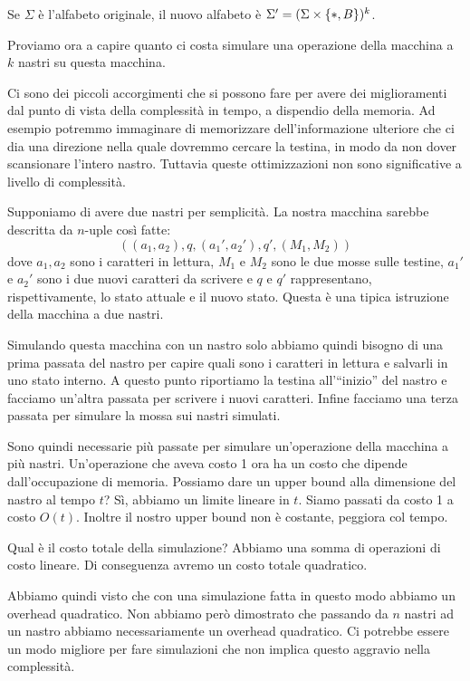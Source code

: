 Se $\Sigma$ è l'alfabeto originale, il nuovo alfabeto è $\Sigma' = (\Sigma \times
\left\{*,B\right\})^{k}$.

Proviamo ora a capire quanto ci costa simulare una operazione della macchina a $k$ nastri su questa
macchina.

Ci sono dei piccoli accorgimenti che si possono fare per avere dei miglioramenti dal punto di vista
della complessità in tempo, a dispendio della memoria. Ad esempio potremmo immaginare di
memorizzare dell'informazione ulteriore che ci dia una direzione nella quale dovremmo cercare la
testina, in modo da non dover scansionare l'intero nastro. Tuttavia queste ottimizzazioni non sono
significative a livello di complessità.

Supponiamo di avere due nastri per semplicità. La nostra macchina sarebbe descritta da $n$-uple
così fatte:
\begin{equation*}
    ((a_{1},a_{2}),q,(a_{1}',a_{2}'),q',(M_{1},M_{2}))
\end{equation*}
dove $a_{1},a_{2}$ sono i caratteri in lettura, $M_{1}$ e $M_{2}$ sono le due mosse sulle testine,
$a_{1}'$ e $a_{2}'$ sono i due nuovi caratteri da scrivere e $q$ e $q'$ rappresentano,
rispettivamente, lo stato attuale e il nuovo stato. Questa è una tipica istruzione della macchina a
due nastri.

Simulando questa macchina con un nastro solo abbiamo quindi bisogno di una prima passata del nastro
per capire quali sono i caratteri in lettura e salvarli in uno stato interno. A questo punto
riportiamo la testina all'``inizio'' del nastro e facciamo un'altra passata per scrivere i nuovi
caratteri. Infine facciamo una terza passata per simulare la mossa sui nastri simulati.

Sono quindi necessarie più passate per simulare un'operazione della macchina a più nastri.
Un'operazione che aveva costo 1 ora ha un costo che dipende dall'occupazione di memoria. Possiamo
dare un upper bound alla dimensione del nastro al tempo $t$?  Sì, abbiamo un limite lineare in $t$.
Siamo passati da costo 1 a costo $O(t)$. Inoltre il nostro upper bound non è costante, peggiora col
tempo.

Qual è il costo totale della simulazione? Abbiamo una somma di operazioni di costo lineare. Di
conseguenza avremo un costo totale quadratico.

Abbiamo quindi visto che con una simulazione fatta in questo modo abbiamo un overhead quadratico.
Non abbiamo però dimostrato che passando da $n$ nastri ad un nastro abbiamo necessariamente un
overhead quadratico. Ci potrebbe essere un modo migliore per fare simulazioni che non implica questo
aggravio nella complessità.

